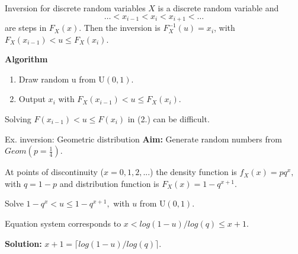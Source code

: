 \documentclass[11pt,compress,t,notes=noshow, xcolor=table]{beamer}
\begin{document}

\begin{vbframe}{Inversion for discrete random variables}
$X$ is a discrete random variable and
$$
\ldots < x_{i-1} < x_i < x_{i+1} < \ldots
$$
are steps in $F_X(x)$.
Then the inversion is $F_X^{-1}(u)=x_i$, with $F_X(x_{i-1}) < u \leq F_X(x_i)$.

\lz

\textbf{Algorithm}
\begin{enumerate}
\item Draw random u from $\text{U}(0, 1)$.
\item Output $x_i$ with $F_X(x_{i-1}) < u \leq F_X(x_i)$.

\end{enumerate}

\lz

Solving $F(x_{i-1}) < u \leq F(x_i)$ in (2.) can be difficult.
\end{vbframe}

\begin{vbframe}{Ex. inversion: Geometric distribution}
\textbf{Aim:} Generate random numbers from $Geom(p=\frac{1}{4})$.

\lz

At points of discontinuity ($x=0,1,2,...$) the density function is $f_X(x)=pq^x,$ with $q=1-p$ and distribution function is $F_X(x)=1-q^{x+1}$.

\lz

Solve $1-q^{x} < u \leq 1-q^{x+1},$ with $u$ from $\text{U}(0, 1)$.

\lz

Equation system corresponds to $x < log(1-u)/log(q) \leq x+1$.

\lz

\textbf{Solution:} $x+1 = \lceil log(1-u)/log(q) \rceil$.





\end{vbframe}
\end{document}

